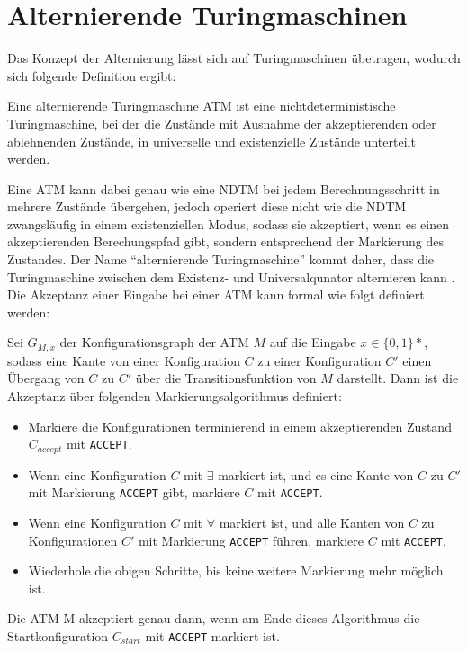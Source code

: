 \section{Alternierende Turingmaschinen} \label{section: alternierende Turingmaschine}
Das Konzept der Alternierung lässt sich auf Turingmaschinen übetragen, wodurch sich folgende Definition ergibt:
\begin{definition}\cite{sipser_introduction_2012}
    Eine alternierende Turingmaschine ATM ist eine nichtdeterministische Turingmaschine, bei der die Zustände mit Ausnahme der akzeptierenden oder ablehnenden Zustände,
    in universelle und existenzielle Zustände unterteilt werden.
\end{definition}

Eine ATM kann dabei genau wie eine NDTM bei jedem Berechnungsschritt in mehrere Zustände übergehen, jedoch operiert diese nicht
wie die NDTM zwangsläufig in einem existenziellen Modus, sodass sie akzeptiert, wenn es einen akzeptierenden Berechungspfad gibt, sondern entsprechend der Markierung des Zustandes.
Der Name \enquote{alternierende Turingmaschine} kommt daher, dass die Turingmaschine zwischen dem Existenz- und Universalqunator alternieren kann \cite{chandra_alternation_1976}.
Die Akzeptanz einer Eingabe bei einer ATM kann formal wie folgt definiert werden:
\begin{definition}\cite{arora_computational_2009}
    Sei $G_{M, x}$ der Konfigurationsgraph der ATM $M$ auf die Eingabe $x \in \{0,1\}*$, sodass eine Kante von einer Konfiguration $C$ zu 
    einer Konfiguration $C'$ einen Übergang von $C$ zu $C'$ über die Transitionsfunktion von $M$ darstellt. Dann ist die Akzeptanz über folgenden
    Markierungsalgorithmus definiert:

    \begin{itemize}
        \item Markiere die Konfigurationen terminierend in einem akzeptierenden Zustand $C_{accept}$ mit \texttt{ACCEPT}.
    \end{itemize}
    \begin{itemize}        
        \item Wenn eine Konfiguration $C$ mit $\exists$ markiert ist, und es eine Kante von $C$ zu $C'$ mit Markierung \texttt{ACCEPT} gibt, markiere $C$ mit \texttt{ACCEPT}.
        \item Wenn eine Konfiguration $C$ mit $\forall$ markiert ist, und alle Kanten von $C$ zu Konfigurationen $C'$ mit Markierung \texttt{ACCEPT} führen, markiere $C$ mit \texttt{ACCEPT}.
        \item Wiederhole die obigen Schritte, bis keine weitere Markierung mehr möglich ist.
    \end{itemize}

    Die ATM M akzeptiert genau dann, wenn am Ende dieses Algorithmus die Startkonfiguration $C_{start}$ mit \texttt{ACCEPT} markiert ist.
\end{definition}
